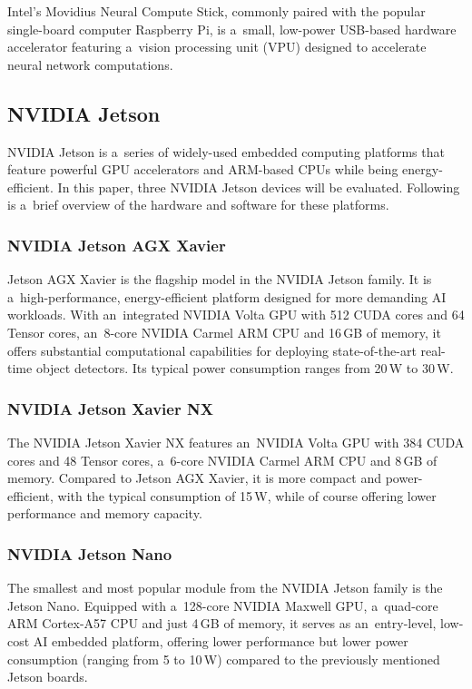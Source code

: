 Intel's Movidius Neural Compute Stick, commonly paired with the popular
single-board computer Raspberry Pi, is a~small, low-power USB-based hardware
accelerator featuring a~vision processing unit (VPU) designed to accelerate
neural network computations.


\subsection{NVIDIA Jetson}
\label{Jetsons}

NVIDIA Jetson is a~series of widely-used embedded computing platforms that
feature powerful GPU accelerators and ARM-based CPUs while being
energy-efficient. In this paper, three NVIDIA Jetson devices will be evaluated.
Following is a~brief overview of the hardware and software for these platforms.


\subsubsection{NVIDIA Jetson AGX Xavier}

Jetson AGX Xavier is the flagship model in the NVIDIA Jetson family. It is
a~high-performance, energy-efficient platform designed for more demanding AI
workloads. With an~integrated NVIDIA Volta GPU with 512 CUDA cores and 64 Tensor
cores, an~8-core NVIDIA Carmel ARM CPU and 16\,GB of memory, it offers substantial
computational capabilities for deploying state-of-the-art real-time object
detectors. Its typical power consumption ranges from 20\,W to 30\,W.


\subsubsection{NVIDIA Jetson Xavier NX}

The NVIDIA Jetson Xavier NX features an~NVIDIA Volta GPU with 384 CUDA cores and
48 Tensor cores, a~6-core NVIDIA Carmel ARM CPU and 8\,GB of memory. Compared
to Jetson AGX Xavier, it is more compact and power-efficient, with the typical
consumption of 15\,W, while of course offering lower performance and memory
capacity.


\subsubsection{NVIDIA Jetson Nano}

The smallest and most popular module from the NVIDIA Jetson family is the Jetson
Nano. Equipped with a~128-core NVIDIA Maxwell GPU, a~quad-core ARM Cortex-A57
CPU and just 4\,GB of memory, it serves as an~entry-level, low-cost AI embedded
platform, offering lower performance but lower power consumption (ranging from 5
to 10\,W) compared to the previously mentioned Jetson boards.


